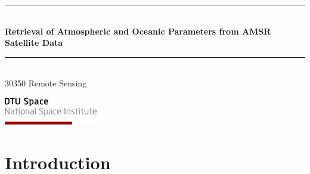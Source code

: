\documentclass[11pt, a4paper]{article}
\begin{document}
\begin{titlepage}
	
	\begin{center}
		\rule{\textwidth}{1mm}\\
		\Huge\bfseries Retrieval of Atmospheric and Oceanic Parameters from AMSR Satellite Data\\ 				%
		\rule{\textwidth}{1mm}\\
		\vspace{0.5cm}
		\Large 30350 Remote Sensing \\[0.5cm]
		
		
		
		\vspace{0.5cm}
	\end{center}
	
	\begin{minipage}{0.3\textwidth}
		\begin{flushleft}
			\includegraphics[height=1.2cm]{DTU-Space.png} 	%
	\end{flushleft}\end{minipage}
\end{titlepage}

\pagestyle{fancy}
\fancyhf{} 
\fancyhead[LE,RO]{ \thepage}




















\newpage
\section{Introduction}
\end{document}
